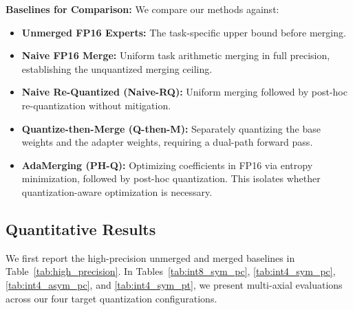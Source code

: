 \textbf{Baselines for Comparison:} We compare our methods against:
\begin{itemize}
  \item \textbf{Unmerged FP16 Experts:} The task-specific upper bound before merging.
  \item \textbf{Naive FP16 Merge:} Uniform task arithmetic merging in full precision, establishing the unquantized merging ceiling.
  \item \textbf{Naive Re-Quantized (Naive-RQ):} Uniform merging followed by post-hoc re-quantization without mitigation.
  \item \textbf{Quantize-then-Merge (Q-then-M):} Separately quantizing the base weights and the adapter weights, requiring a dual-path forward pass.
  \item \textbf{AdaMerging (PH-Q):} Optimizing coefficients in FP16 via entropy minimization, followed by post-hoc quantization. This isolates whether quantization-aware optimization is necessary.
\end{itemize}

\subsection{Quantitative Results}

We first report the high-precision unmerged and merged baselines in Table~\ref{tab:high_precision}. In Tables~\ref{tab:int8_sym_pc}, \ref{tab:int4_sym_pc}, \ref{tab:int4_asym_pc}, and \ref{tab:int4_sym_pt}, we present multi-axial evaluations across our four target quantization configurations.

\begin{table}[h]
\centering
\caption{\textbf{High-Precision Baselines (FP16).} Unmerged experts establish the performance ceiling, while Naive FP16 Merge represents the full-precision merging baseline.}
\label{tab:high_precision}
\vskip 0.1in
\end{table}

